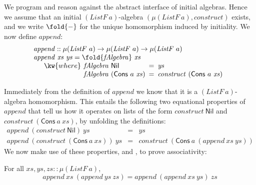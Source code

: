 We program and reason against the abstract interface of initial
algebras. Hence we assume that an initial $(\mathit{ListF}~a)$-algebra
$(\mu(\mathit{ListF}~a), \mathit{construct})$ exists, and we write
$\fold{-}$ for the unique homomorphism induced by initiality. We now
define $\mathit{append}$:
\begin{displaymath}
  \begin{array}{l}
    \mathit{append} :: \mu(\mathit{ListF}~a) \to \mu(\mathit{ListF}~a) \to \mu(\mathit{ListF}~a) \\
    \mathit{append}~\mathit{xs}~\mathit{ys} = \fold{\mathit{fAlgebra}}~\mathit{xs} \\
    \quad\begin{array}{r@{\hspace{0.4em}}l@{\hspace{0.5em}}c@{\hspace{0.5em}}l}
      \kw{where} & \mathit{fAlgebra}~\mathsf{Nil} &=& \mathit{ys} \\
                     & \mathit{fAlgebra}~(\mathsf{Cons}~a~\mathit{xs}) &=& \mathit{construct}~(\mathsf{Cons}~a~\mathit{xs})
    \end{array}
  \end{array}
\end{displaymath}

Immediately from the definition of $\mathit{append}$ we know that it
is a $(\mathit{ListF}~a)$-algebra homomorphism. This entails the
following two equational properties of $\mathit{append}$ that tell us
how it operates on lists of the form $\mathit{construct}~\mathsf{Nil}$
and $\mathit{construct}~(\mathsf{Cons}~a~\mathit{xs})$, by unfolding
the definitions:
\begin{eqnarray}
  \label{eq:append-nil}
  \mathit{append}~(\mathit{construct}~\mathsf{Nil})~\mathit{ys} & = & \mathit{ys} \\
  \label{eq:append-cons}
  \mathit{append}~(\mathit{construct}~(\mathsf{Cons}~a~\mathit{xs}))~\mathit{ys} & = & \mathit{construct}~(\mathsf{Cons}~a~(\mathit{append}~\mathit{xs}~\mathit{ys}))
\end{eqnarray}
We now make use of these properties, and
, to prove associativity:

\begin{theorem}\label{thm:append-assoc}
  For all $\mathit{xs}, \mathit{ys}, \mathit{zs} :: \mu(\mathit{ListF}~a)$,
  \begin{displaymath}
    \mathit{append}~\mathit{xs}~(\mathit{append}~\mathit{ys}~\mathit{zs}) = \mathit{append}~(\mathit{append}~\mathit{xs}~\mathit{ys})~\mathit{zs}
  \end{displaymath}
\end{theorem}

